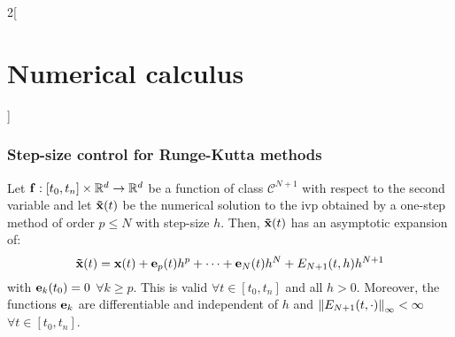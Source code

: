 \documentclass[../../../main_math.tex]{subfiles}
\begin{document}
\begin{multicols}{2}[\section{Numerical calculus}]
  \subsubsection{Step-size control for Runge-Kutta methods}
  \begin{theorem}\label{NC:errorControl}
    Let $\boldsymbol{\mathrm{f}}:[t_0,t_n]\times\mathbb{R}^d\rightarrow\mathbb{R}^d$ be a function of class $\mathcal{C}^{N+1}$ with respect to the second variable and let $\boldsymbol{\mathrm{\tilde{x}}}(t)$ be the numerical solution to the ivp  obtained by a one-step method of order $p\leq N$ with step-size $h$. Then, $\boldsymbol{\mathrm{\tilde{x}}}(t)$ has an asymptotic expansion of:
    $$\boldsymbol{\mathrm{\tilde{x}}}(t)=\boldsymbol{\mathrm{x}}(t)+\boldsymbol{\mathrm{e}}_p(t)h^p+\cdots+\boldsymbol{\mathrm{e}}_N(t)h^N+E_{N+1}(t,h)h^{N+1}$$
    with $\boldsymbol{\mathrm{e}}_k(t_0)=0$ $\forall k\geq p$. This is valid $\forall t\in[t_0,t_n]$ and all $h>0$. Moreover, the functions $\boldsymbol{\mathrm{e}}_k$ are differentiable and independent of $h$ and $\left\|E_{N+1}(t,\cdot)\right\|_\infty<\infty$ $\forall t\in[t_0,t_n]$.
  \end{theorem}

\end{multicols}
\end{document}
